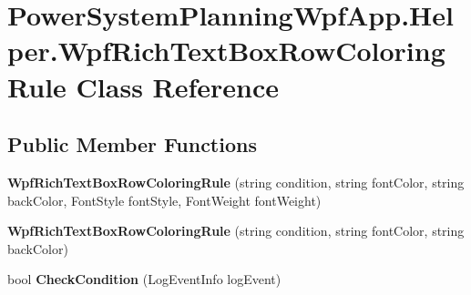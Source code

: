 \hypertarget{class_power_system_planning_wpf_app_1_1_helper_1_1_wpf_rich_text_box_row_coloring_rule}{}\section{Power\+System\+Planning\+Wpf\+App.\+Helper.\+Wpf\+Rich\+Text\+Box\+Row\+Coloring\+Rule Class Reference}
\label{class_power_system_planning_wpf_app_1_1_helper_1_1_wpf_rich_text_box_row_coloring_rule}
\subsection*{Public Member Functions}
\begin{DoxyCompactItemize}
\item 
{\bfseries Wpf\+Rich\+Text\+Box\+Row\+Coloring\+Rule} (string condition, string font\+Color, string back\+Color, Font\+Style font\+Style, Font\+Weight font\+Weight)\hypertarget{class_power_system_planning_wpf_app_1_1_helper_1_1_wpf_rich_text_box_row_coloring_rule_ae5180aeac6418aee6212ae92907ca948}{}\label{class_power_system_planning_wpf_app_1_1_helper_1_1_wpf_rich_text_box_row_coloring_rule_ae5180aeac6418aee6212ae92907ca948}

\item 
{\bfseries Wpf\+Rich\+Text\+Box\+Row\+Coloring\+Rule} (string condition, string font\+Color, string back\+Color)\hypertarget{class_power_system_planning_wpf_app_1_1_helper_1_1_wpf_rich_text_box_row_coloring_rule_aad529f4559f3adc3c9a092bb43fa5712}{}\label{class_power_system_planning_wpf_app_1_1_helper_1_1_wpf_rich_text_box_row_coloring_rule_aad529f4559f3adc3c9a092bb43fa5712}

\item 
bool {\bfseries Check\+Condition} (Log\+Event\+Info log\+Event)\hypertarget{class_power_system_planning_wpf_app_1_1_helper_1_1_wpf_rich_text_box_row_coloring_rule_ab6b52cc5cc7213fa6797dac3901dc6e1}{}\label{class_power_system_planning_wpf_app_1_1_helper_1_1_wpf_rich_text_box_row_coloring_rule_ab6b52cc5cc7213fa6797dac3901dc6e1}

\end{DoxyCompactItemize}
